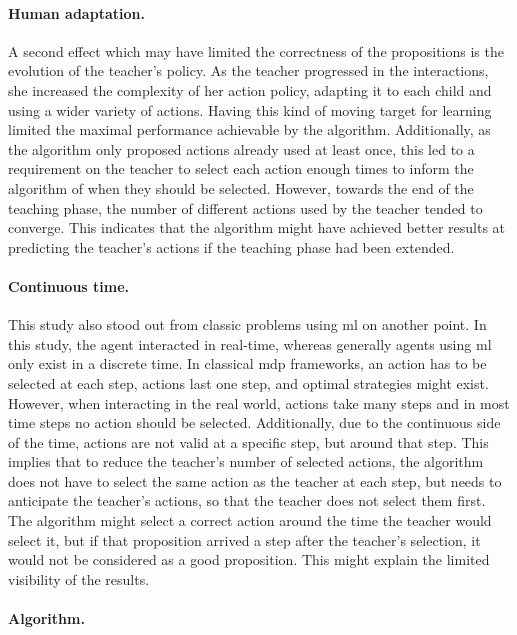 \paragraph{Human adaptation.}

A second effect which may have limited the correctness of the propositions is the evolution of the teacher's policy. As the teacher progressed in the interactions, she increased the complexity of her action policy, adapting it to each child and using a wider variety of actions. Having this kind of moving target for learning limited the maximal performance achievable by the algorithm. Additionally, as the algorithm only proposed actions already used at least once, this led to a requirement on the teacher to select each action enough times to inform the algorithm of when they should be selected. However, towards the end of the teaching phase, the number of different actions used by the teacher tended to converge. This indicates that the algorithm might have achieved better results at predicting the teacher's actions if the teaching phase had been extended.

\paragraph{Continuous time.}

This study also stood out from classic problems using \gls{ml} on another point. In this study, the agent interacted in real-time, whereas generally agents using \gls{ml} only exist in a discrete time. In classical \gls{mdp} frameworks, an action has to be selected at each step, actions last one step, and optimal strategies might exist. However, when interacting in the real world, actions take many steps and in most time steps no action should be selected. Additionally, due to the continuous side of the time, actions are not valid at a specific step, but around that step. This implies that to reduce the teacher's number of selected actions, the algorithm does not have to select the same action as the teacher at each step, but needs to anticipate the teacher's actions, so that the teacher does not select them first. The algorithm might select a correct action around the time the teacher would select it, but if that proposition arrived a step after the teacher's selection, it would not be considered as a good proposition. This might explain the limited visibility of the results. 

\paragraph{Algorithm.}

